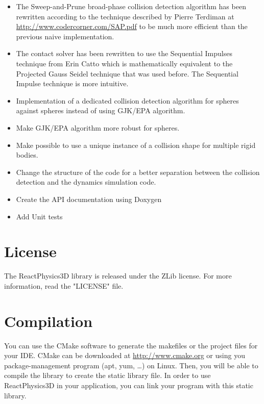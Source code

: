 \documentclass[a4paper,12pt]{article}
\begin{document}
  \begin{itemize}
    \item The Sweep-and-Prune broad-phase collision detection
      algorithm has been rewritten according to the technique
      described by Pierre Terdiman at
      \url{http://www.codercorner.com/SAP.pdf} to be much more efficient
      than the previous naive implementation.
    \item The contact solver has been rewritten to use the Sequential
      Impulses technique from Erin Catto which is mathematically
      equivalent to the Projected Gauss Seidel technique that was used
      before. The Sequential Impulse technique is more
      intuitive.
    \item Implementation of a dedicated collision detection algorithm for spheres
      against spheres instead of using GJK/EPA algorithm.
    \item Make GJK/EPA algorithm more robust for spheres.
    \item Make possible to use a unique instance of a collision shape
      for multiple rigid bodies.
    \item Change the structure of the code for a better separation
      between the collision detection and the dynamics simulation code.
    \item Create the API documentation using Doxygen
    \item Add Unit tests
   \end{itemize}

    \section{License}

    The ReactPhysics3D library is released under the ZLib license. For more information, read the "LICENSE" file.

    \section{Compilation}
    \label{sec:compilation}

    You can use the CMake software to generate the makefiles or the 
    project files for your IDE. CMake can be downloaded at
    \url{http://www.cmake.org} or using you package-management program
    (apt, yum, \dots) on Linux. Then, you will be able to compile the library to create the static library
    file. In order to use ReactPhysics3D in
    your application, you can link your program with this static library.
\end{document}
